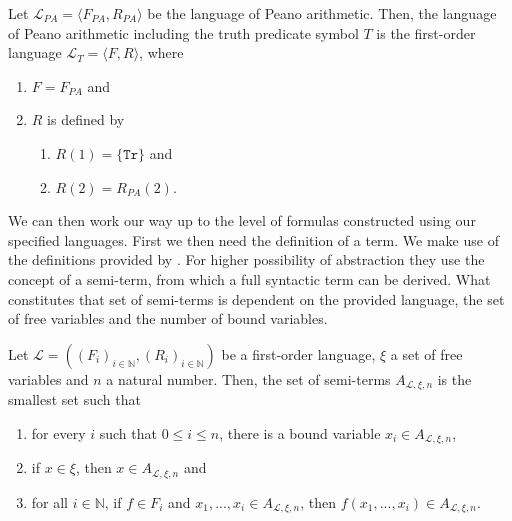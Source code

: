 \begin{definition}\label{def:LTr}
    \leanok
    Let $\mathcal{L}_{PA} = \langle F_{PA},R_{PA}\rangle$ be the language of Peano arithmetic. Then, the language of Peano arithmetic including the truth predicate symbol $T$ is the first-order language $\mathcal{L}_T = \langle F, R \rangle$, where
    \begin{enumerate}
        \item $F = F_{PA}$ and
        \item $R$ is defined by
        \begin{enumerate}
            \item $R(1) = \{\texttt{Tr}\}$ and
            \item $R(2) = R_{PA}(2)$.
        \end{enumerate}
    \end{enumerate}
\end{definition}

We can then work our way up to the level of formulas constructed using our specified languages. First we then need the definition of a term. We make use of the definitions provided by \cite{ffl}. For higher possibility of abstraction they use the concept of a semi-term, from which a full syntactic term can be derived. What constitutes that set of semi-terms is dependent on the provided language, the set of free variables and the number of bound variables.

\begin{definition}\label{def:semi-term}
    \leanok
    Let $\mathcal{L} = ((F_i)_{i \in \mathbb{N}},(R_i)_{i \in \mathbb{N}})$ be a first-order language, $\xi$ a set of free variables and $n$ a natural number. Then, the set of semi-terms $A_{\mathcal{L},\xi,n}$ is the smallest set such that
    \begin{enumerate}
        \item for every $i$ such that $0 \leq i \leq n$, there is a bound variable $x_i \in A_{\mathcal{L},\xi,n}$,
        \item if $x \in \xi$, then $x \in A_{\mathcal{L},\xi,n}$ and
        \item for all $i \in \mathbb{N}$, if $f \in F_i$ and $x_1,...,x_i \in A_{\mathcal{L},\xi,n}$, then $f(x_1,...,x_i) \in A_{\mathcal{L},\xi,n}$.
    \end{enumerate}
\end{definition}

